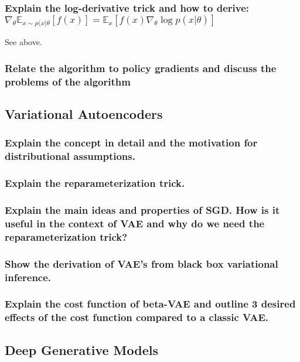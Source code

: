 \documentclass{article}
\newcommand{\E}[2]{\mathbb{E}_{#1}\left[#2\right]}
\begin{document}
\subsubsection{Explain the log-derivative trick and how to derive:
$\nabla_\theta \E{x \sim p(x|\theta}{f(x)} = \E{x}{f(x) \nabla_\theta \log p(x|\theta)}$}
See above.

\subsubsection{Relate the algorithm to policy gradients and discuss the problems of the algorithm}







\subsection{Variational Autoencoders}

\subsubsection{Explain the concept in detail and the motivation for distributional assumptions.}

\subsubsection{Explain the reparameterization trick.}

\subsubsection{Explain the main ideas and properties of SGD. How is it useful in the context of VAE and why do we need the reparameterization trick?}

\subsubsection{Show the derivation of VAE's from black box variational inference.}

\subsubsection{Explain the cost function of beta-VAE and outline 3 desired effects of the cost function compared to a classic VAE.}




\subsection{Deep Generative Models}
\end{document}
